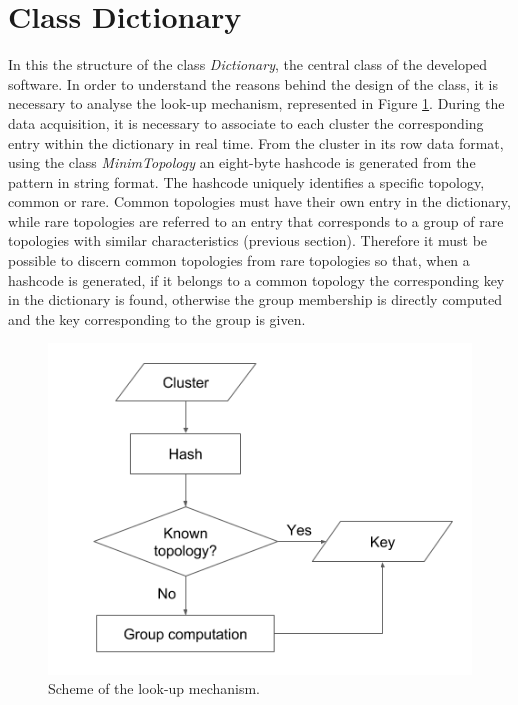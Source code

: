 \section{Class Dictionary}
In this the structure of the class \textit{Dictionary}, the central class of the developed software. In order to understand the reasons behind the design of the class, it is necessary to analyse the look-up mechanism, represented in Figure \ref{fig:lucap}. During the data acquisition, it is necessary to associate to each cluster the corresponding entry within the dictionary in real time. From the cluster in its row data format, using the class \textit{MinimTopology} an eight-byte hashcode is generated from the pattern in string format. The hashcode uniquely identifies a specific topology, common or rare.
Common topologies must have their own entry in the dictionary, while rare topologies are referred to an entry that corresponds to a group of rare topologies with similar characteristics (previous section).
Therefore it must be possible to discern common topologies from rare topologies so that, when a hashcode is generated, if it belongs to a common topology the corresponding key in the dictionary is found, otherwise the group membership is directly computed and the key corresponding to the group is given.
%
\begin{figure}
  \centering
  \includegraphics[scale=0.5]{figures/lucap.png}
  \caption{Scheme of the look-up mechanism.}
  \label{fig:lucap}
\end{figure}
%